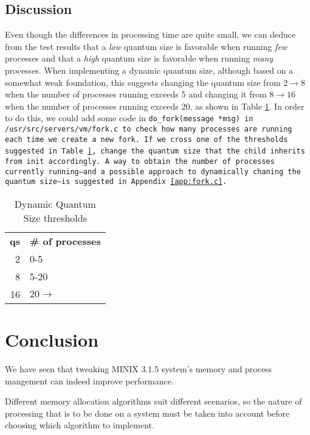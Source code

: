 \documentclass[11pt]{article}
\begin{document}
\subsection{Discussion}
Even though the differences in processing time are quite small, we can deduce from the test results that a \emph{low} quantum size is favorable when running \emph{few} processes and that a \emph{high} quantum size is favorable when running \emph{many} processes. When implementing a dynamic quantum size, although based on a somewhat weak foundation, this suggests changing the quantum size from $ 2 \rightarrow 8 $ when the number of processes running exceeds 5 and changing it from $ 8 \rightarrow 16 $ when the number of processes running exceeds 20, as shown in Table \ref{tab:dynamic_qs}. In order to do this, we could add some code in \tt do\_fork(message *msg) \normalfont in \tt /usr/src/servers/vm/fork.c \normalfont to check how many processes are running each time we create a new fork. If we cross one of the thresholds suggested in Table \ref{tab:dynamic_qs}, change the quantum size that the child inherits from \tt init \normalfont accordingly. A way to obtain the number of processes currently running---and a possible approach to dynamically chaning the quantum size---is suggested in Appendix \ref{app:fork.c}.

\begin{table}[H]
	\begin{center}
		\begin{tabular}{ r | l }
		{\bf qs} & {\bf\# of processes }\\
		2 & 0-5\\
		8 & 5-20\\
		16 & $ 20 \rightarrow $\\
		\end{tabular}
	  
	  \caption{Dynamic Quantum Size thresholds}
	  \label{tab:dynamic_qs}
	\end{center}
\end{table}

\section{Conclusion}
We have seen that tweaking MINIX 3.1.5 system's memory and process mangement can indeed improve performance.

Different memory allocation algorithms suit different scenarios, so the nature of processing that is to be done on a system must be taken into account before choosing which algorithm to implement.
\end{document}
